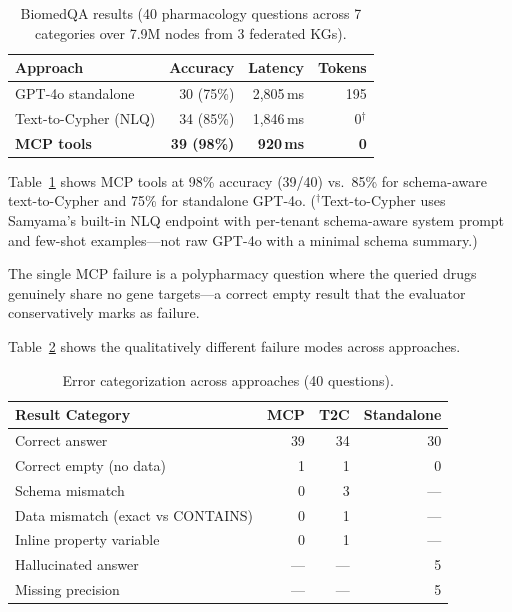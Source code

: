 \documentclass[sigconf, anonymous, review]{acmart}
\begin{document}
\begin{table}[t]
\centering
\caption{BiomedQA results (40 pharmacology questions across
  7 categories over 7.9M nodes from 3 federated KGs).}
\label{tab:biomedqa}
\small
\begin{tabular}{@{}lrrr@{}}
\toprule
\textbf{Approach} & \textbf{Accuracy} & \textbf{Latency} & \textbf{Tokens} \\
\midrule
GPT-4o standalone & 30 (75\%) & 2,805\,ms & 195 \\
Text-to-Cypher (NLQ) & 34 (85\%) & 1,846\,ms & 0$^{\dagger}$ \\
\textbf{MCP tools}& \textbf{39 (98\%)} & \textbf{920\,ms} & \textbf{0} \\
\bottomrule
\end{tabular}
\end{table}

Table~\ref{tab:biomedqa} shows MCP tools at 98\% accuracy
(39/40) vs.\ 85\% for schema-aware text-to-Cypher and 75\%
for standalone GPT-4o.  ($^{\dagger}$Text-to-Cypher uses
Samyama's built-in NLQ endpoint with per-tenant schema-aware
system prompt and few-shot examples---not raw GPT-4o with a
minimal schema summary.)

The single MCP failure is a polypharmacy question where the
queried drugs genuinely share no gene targets---a correct
empty result that the evaluator conservatively marks as failure.

Table~\ref{tab:error_cats} shows the qualitatively different
failure modes across approaches.

\begin{table}[t]
\centering
\caption{Error categorization across approaches (40 questions).}
\label{tab:error_cats}
\small
\begin{tabular}{@{}lrrr@{}}
\toprule
\textbf{Result Category} & \textbf{MCP} & \textbf{T2C} & \textbf{Standalone} \\
\midrule
Correct answer           & 39 & 34 & 30 \\
Correct empty (no data)  &  1 &  1 &  0 \\
Schema mismatch          &  0 &  3 & --- \\
Data mismatch (exact vs CONTAINS) & 0 & 1 & --- \\
Inline property variable &  0 &  1 & --- \\
Hallucinated answer      & --- & --- &  5 \\
Missing precision        & --- & --- &  5 \\
\bottomrule
\end{tabular}
\end{table}
\end{document}
